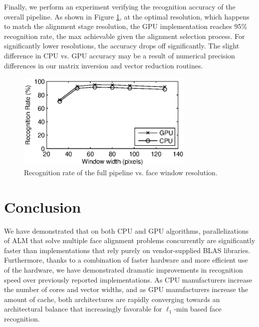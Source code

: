 \documentclass[preprint]{sigplanconf}
\begin{document}
Finally, we perform an experiment verifying the recognition accuracy of the
overall pipeline.  As shown in Figure \ref{fig:accuracy_vs_resolution},
at the optimal resolution, which happens to match the alignment stage
resolution, the GPU implementation reaches 95\% recognition rate, the max
achievable given the alignment selection process.  For significantly lower resolutions,
the accuracy drops off significantly.  The slight difference in CPU vs. GPU
accuracy may be a result of numerical precision differences in our matrix
inversion and vector reduction routines.
\begin{figure}[t!]
\centering
\includegraphics[width=3.35in]{figures/accuracyVsResolution} 
\caption{Recognition rate of the full pipeline vs. face window resolution.} 
\label{fig:accuracy_vs_resolution}
\end{figure}

\section{Conclusion}
We have demonstrated that on both CPU and GPU algorithms, parallelizations of
ALM that solve multiple face alignment problems concurrently are significantly
faster than implementations that rely purely on vendor-supplied BLAS libraries.
Furthermore, thanks to a combination of faster hardware and more efficient use
of the hardware, we have demonstrated dramatic improvements in recognition
speed over previously reported implementations.
As CPU manufacturers increase the number of cores and vector widths, and as GPU 
manufacturers increase the amount
of cache, both architectures are rapidly converging towards an architectural balance
that increasingly favorable for $\ell_1$-min based face recognition.




\end{document}
